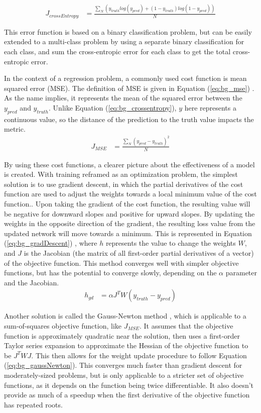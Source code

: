 	\begin{align}
		J_{crossEntropy} &= \frac{\sum_N (y_{truth}log(y_{pred}) + (1-y_{truth})log(1-y_{pred})) }{N} \label{eq:bg_crossentropy} 
	\end{align}
	\par This error function is based on a binary classification problem, but can be easily extended to a multi-class problem by using a separate binary classification for each class, and sum the cross-entropic error for each class to get the total cross-entropic error.  
	\par In the context of a regression problem, a commonly used cost function is mean squared error (MSE). The definition of MSE is given in Equation (\ref{eq:bg_mse}) \cite{lossFcns}. As the name implies, it represents the mean of the squared error between the $y_{pred}$ and $y_{truth}$. Unlike Equation (\ref{eq:bg_crossentropy}), $y$ here represents a continuous value, so the distance of the prediction to the truth value impacts the metric. 
	\begin{align}
		J_{MSE} &= \frac{\sum_N (y_{pred}-y_{truth})^2}{N} \label{eq:bg_mse}
	\end{align}
	\par By using these cost functions, a clearer picture about the effectiveness of a model is created. With training reframed as an optimization problem, the simplest solution is to use gradient descent, in which the partial derivatives of the cost function are used to adjust the weights towards a local minimum value of the cost function.. Upon taking the gradient of the cost function, the resulting value will be negative for downward slopes and positive for upward slopes. By updating the weights in the opposite direction of the gradient, the resulting loss value from the updated network will move towards a minimum. This is represented in Equation (\ref{eq:bg_gradDescent}) \cite{backpropIntro}, where $h$ represents the value to change the weights $W$, and $J$ is the Jacobian (the matrix of all first-order partial derivatives of a vector) of the objective function. This method converges well with simpler objective functions, but has the potential to converge slowly, depending on the $\alpha$ parameter and the Jacobian.
	\begin{align}
		h_{gd} &= \alpha J^T W(y_{truth}-y_{pred}) \label{eq:bg_gradDescent}
	\end{align}
	\par Another solution is called the Gauss-Newton method \cite{gauss_newton_alg}, which is applicable to a sum-of-squares objective function, like $J_{MSE}$. It assumes that the objective function is approximately quadratic near the solution, then uses a first-order Taylor series expansion to approximate the Hessian of the objective function to be $J^TWJ$. This then allows for the weight update procedure to follow Equation (\ref{eq:bg_gaussNewton}). This converges much faster than gradient descent for moderately-sized problems, but is only applicable to a stricter set of objective functions, as it depends on the function being twice differentiable. It also doesn't provide as much of a speedup when the first derivative of the objective function has repeated roots. 

